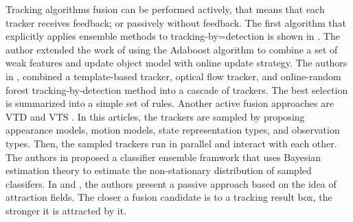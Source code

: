 Tracking algorithms fusion can be performed actively, that means that each tracker receives feedback; or passively without feedback. The first algorithm that explicitly applies ensemble methods to tracking-by=detection is shown in \cite{Avidan2007}. The author extended the work of \cite{Collins2005} using the Adaboost algorithm to combine a set of weak features and update object model with online update strategy. The authors in \cite{Santner2010a}, combined a template-based tracker, optical flow tracker, and online-random forest tracking-by-detection method into a cascade of trackers. The best selection is summarized into a simple set of rules. Another active fusion approaches are VTD \cite{Kwon2009} and VTS \cite{Kwon2011a}. In this articles, the trackers are sampled by proposing appearance models, motion models, state representation types, and observation types. Then, the sampled trackers run in parallel and interact with each other. The authors in \cite{Bai2013} proposed a classifier ensemble framwork that uses Bayesian estimation theory to estimate the non-stationary distribution of sampled classifers. In \cite{Bailer2013} and \cite{Bailer2014}, the authors present a passive approach based on the idea of attraction fields. The closer a fusion candidate is to a tracking result box, the stronger it is attracted by it.